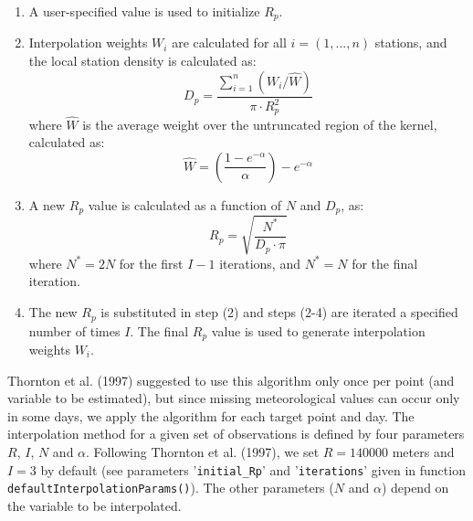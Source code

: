 \documentclass[11pt,a4paper]{article}
\begin{document}
\begin{enumerate}
\item{A user-specified value is used to initialize $R_p$.}
\item{Interpolation weights $W_i$ are calculated for all $i = (1, ..., n)$ stations, and the local station density is calculated as:
\begin{equation}
D_p = \frac{\sum_{i=1}^{n}{(W_i/\hat{W})}}{\pi \cdot R_p^2}
\end{equation}
where $\hat{W}$ is the average weight over the untruncated region of the kernel, calculated as:
\begin{equation}
\hat{W} = \left( \frac{1 - e^{-\alpha}}{\alpha}\right)- e^{-\alpha}
\end{equation}
}
\item{A new $R_p$ value is calculated as a function of $N$ and $D_p$, as:
\begin{equation}
R_p = \sqrt{\frac{N^*}{D_p \cdot \pi}}
\end{equation}
where $N^* = 2N$ for the first $I - 1$ iterations, and $N^* = N$ for the final iteration.
}
\item{ The new $R_p$ is substituted in step (2) and steps (2-4) are iterated a specified number of times $I$. The final $R_p$ value is used to generate interpolation weights $W_i$.}
\end{enumerate}
Thornton et al. (1997) suggested to use this algorithm only once per point (and variable to be estimated), but since missing meteorological values can occur only in some days, we apply the algorithm for each target point and day. The interpolation method for a given set of observations is defined by four parameters $R$, $I$, $N$ and $\alpha$. Following Thornton et al. (1997), we set $R = 140000$ meters and $I = 3$ by default (see parameters '\texttt{initial\_Rp}' and '\texttt{iterations}' given in function \texttt{defaultInterpolationParams()}). The other parameters ($N$ and $\alpha$) depend on the variable to be interpolated.
\end{document}

